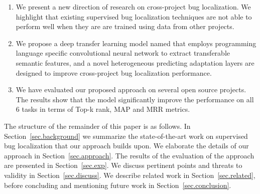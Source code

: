 \begin{enumerate}

\item We present a new direction of research on cross-project bug localization. We highlight that existing supervised bug localization techniques are not able to perform well when they are are trained using data from other projects. 
    
\item {} We propose a deep transfer learning model named \TRANPCNN that employs programming language specific convolutional neural network to extract transferable semantic features, and a novel heterogeneous predicting adaptation layers are designed to improve cross-project bug localization performance.  

\item {} We have evaluated our proposed approach on several open source projects. The results show that the \TRANPCNN model significantly improve the performance on all 6 tasks in terms of Top-k rank, MAP and MRR metrics. 


\end{enumerate}

The structure of the remainder of this paper is as follows. In Section~\ref{sec.background} we summarize the state-of-the-art work on supervised bug localization that our approach builds upon. We elaborate the details of our approach in Section~\ref{sec.approach}. The results of the evaluation of the approach are presented in Section~\ref{sec.exp}. We discuss pertinent points and threats to validity in Section~\ref{sec.discuss}. We describe related work in Section~\ref{sec.related}, before concluding and mentioning future work in Section~\ref{sec.conclusion}. 